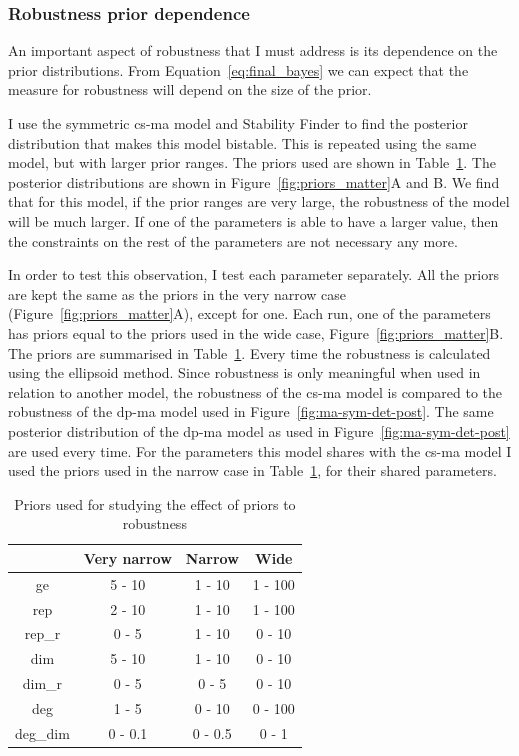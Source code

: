\subsubsection{Robustness prior dependence}

An important aspect of robustness that I must address is its dependence on the prior distributions. From Equation~\ref{eq:final_bayes} we can expect that the measure for robustness will depend on the size of the prior. 

I use the symmetric \acrshort{cs-ma} model and Stability Finder to find the posterior distribution that makes this model bistable. This is repeated using the same model, but with larger prior ranges. The priors used are shown in Table~\ref{tab:prior_study}. The posterior distributions are shown in Figure~\ref{fig:priors_matter}A and B. We find that for this model, if the prior ranges are very large, the robustness of the model will be much larger. If one of the parameters is able to have a larger value, then the constraints on the rest of the parameters are not necessary any more. 

In order to test this observation, I test each parameter separately. All the priors are kept the same as the priors in the very narrow case (Figure~\ref{fig:priors_matter}A), except for one. Each run, one of the parameters has priors equal to the priors used in the wide case, Figure~\ref{fig:priors_matter}B. The priors are summarised in Table~\ref{tab:prior_study}. Every time the robustness is calculated using the ellipsoid method. Since robustness is only meaningful when used in relation to another model, the robustness of the \acrshort{cs-ma} model is compared to the robustness of the \acrshort{dp-ma} model used in Figure~\ref{fig:ma-sym-det-post}. The same posterior distribution of the \acrshort{dp-ma} model as used in Figure~\ref{fig:ma-sym-det-post} are used every time. For the parameters this model shares with the \acrshort{cs-ma} model I used the priors used in the narrow case in Table~\ref{tab:prior_study}, for their shared parameters. 



\begin{table}[htbp]
\centering
\caption{Priors used for studying the effect of priors to robustness}
\label{tab:prior_study}
\begin{tabular}{@{}cccc@{}}
\toprule
         & Very narrow & Narrow  & Wide    \\ \midrule
ge       & 5 - 10      & 1 - 10  & 1 - 100 \\
rep      & 2 - 10      & 1 - 10  & 1 - 100 \\
rep\_r   & 0 - 5       & 1 - 10  & 0 - 10  \\
dim      & 5 - 10      & 1 - 10  & 0 - 10  \\
dim\_r   & 0 - 5       & 0 - 5   & 0 - 10  \\
deg      & 1 - 5       & 0 - 10  & 0 - 100 \\
deg\_dim & 0 - 0.1     & 0 - 0.5 & 0 - 1   \\ \bottomrule
\end{tabular}
\end{table}

